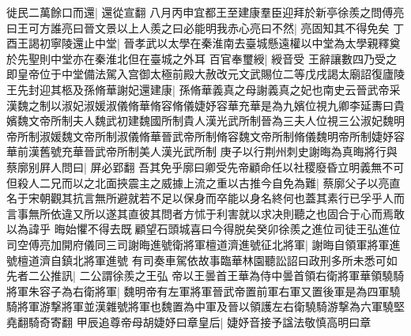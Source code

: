 徙民二萬餘口而還|{
	還從宣翻}
八月丙申宜都王至建康羣臣迎拜於新亭徐羨之問傅亮曰王可方誰亮曰晉文景以上人羨之曰必能明我赤心亮曰不然|{
	亮固知其不得免矣}
丁酉王謁初寧陵還止中堂|{
	晉孝武以太學在秦淮南去臺城懸遠權以中堂為太學親釋奠於先聖則中堂亦在秦淮北但在臺城之外耳}
百官奉璽綬|{
	綬音受}
王辭讓數四乃受之即皇帝位于中堂備法駕入宫御太極前殿大赦改元文武賜位二等戊戌謁太廟詔復廬陵王先封迎其柩及孫脩華謝妃還建康|{
	孫脩華義真之母謝義真之妃也南史云晉武帝采漢魏之制以淑妃淑媛淑儀脩華脩容脩儀婕妤容華充華是為九嬪位視九卿李延夀曰貴嬪魏文帝所制夫人魏武初建魏國所制貴人漢光武所制晉為三夫人位視三公淑妃魏明帝所制淑媛魏文帝所制淑儀脩華晉武帝所制脩容魏文帝所制脩儀魏明帝所制婕妤容華前漢舊號充華晉武帝所制美人漢光武所制}
庚子以行荆州刺史謝晦為真晦將行與蔡廓别屛人問曰|{
	屏必郢翻}
吾其免乎廓曰卿受先帝顧命任以社稷廢昏立明義無不可但殺人二兄而以之北面挾震主之威據上流之重以古推今自免為難|{
	蔡廓父子以亮直名于宋朝觀其抗言無所避就若不足以保身而卒能以身名終何也蓋其素行已孚乎人而言事無所依違又所以遂其直彼其問者方怵于利害就以求决則聽之也固合于心而焉敢以為諱乎}
晦始懼不得去既顧望石頭城喜曰今得脱矣癸卯徐羨之進位司徒王弘進位司空傅亮加開府儀同三司謝晦進號衛將軍檀道濟進號征北將軍|{
	謝晦自領軍將軍進號檀道濟自鎮北將軍進號}
有司奏車駕依故事臨華林園聽訟詔曰政刑多所未悉可如先者二公推訊|{
	二公謂徐羨之王弘}
帝以王曇首王華為侍中曇首領右衛將軍華領驍騎將軍朱容子為右衛將軍|{
	魏明帝有左軍將軍晉武帝置前軍右軍又置後軍是為四軍驍騎將軍游撃將軍並漢雜號將軍也魏置為中軍及晉以領護左右衛驍騎游撃為六軍驍堅堯翻騎奇寄翻}
甲辰追尊帝母胡婕妤曰章皇后|{
	婕妤音接予諡法敬慎高明曰章}



